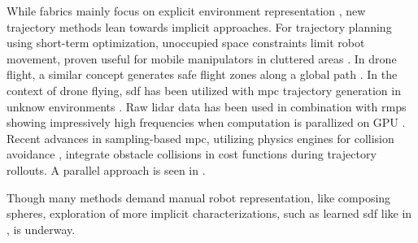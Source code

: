 While \ac{fabrics} mainly focus on explicit environment representation
\cite{Spahn2022,Ratliff2020}, new trajectory methods lean towards implicit
approaches. For trajectory planning using short-term optimization, unoccupied
space constraints limit robot movement, proven useful for mobile manipulators in
cluttered areas \cite{Spahn2021}.
In drone flight, a similar concept generates safe flight zones along a global
path \cite{Liu2017a,Tordesillas2019a}. In the context of drone flying,
\ac{sdf} has been utilized with \ac{mpc} trajectory generation in unknow
environments \cite{Oleynikova2017voxblox}. Raw lidar data has been used in combination
with \acp{rmp} showing impressively high frequencies when computation is
parallized on GPU \cite{Pantic2023obstacle}.
Recent advances in sampling-based
\ac{mpc}, utilizing physics engines for collision avoidance
\cite{Pezzato2023sampling},
integrate obstacle collisions in cost functions during trajectory rollouts. A
parallel approach is seen in \cite{Sundaralingam2023curobo}.

Though many methods demand manual robot representation, like composing spheres,
exploration of more implicit characterizations, such as learned \ac{sdf} like in
\cite{Liu2022regularized,Koptev2023neural}, is underway.
